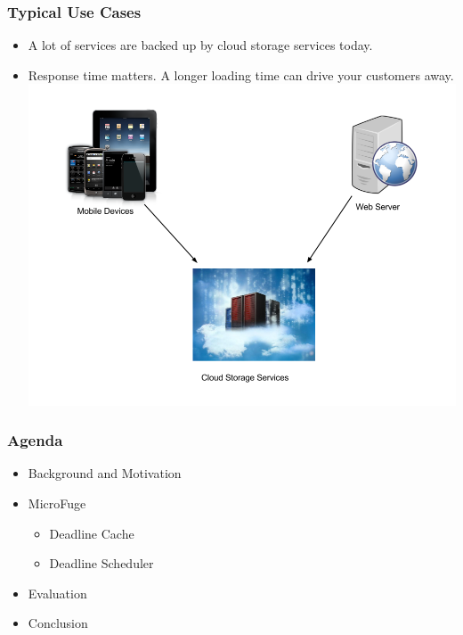 \documentclass{beamer}
\begin{document}
\begin{frame}
  \frametitle{Typical Use Cases}
  \begin{itemize}
  \item A lot of services are backed up by cloud storage services today.
  \item Response time matters. A longer loading time can drive your customers away.
    \includegraphics[scale=0.26]{img/A_Cloud_Example.png}
  \end{itemize}
\end{frame}


\begin{frame}
  \frametitle{Agenda}
  \begin{itemize}
  \item[\Checkmark] Background and Motivation
  \item MicroFuge
    \begin{itemize}
    \item Deadline Cache
    \item Deadline Scheduler
    \end{itemize}
  \item Evaluation
  \item Conclusion
  \end{itemize}
\end{frame}
\end{document}

